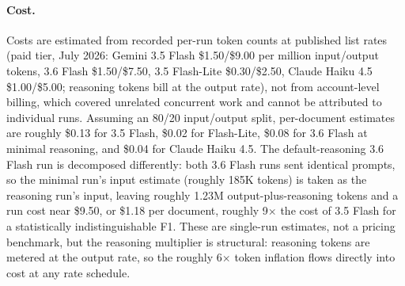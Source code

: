 \documentclass[11pt]{article}
\begin{document}
\paragraph{Cost.} Costs are estimated from recorded per-run token counts
at published list rates (paid tier, July 2026: Gemini 3.5 Flash
\$1.50/\$9.00 per million input/output tokens, 3.6 Flash \$1.50/\$7.50,
3.5 Flash-Lite \$0.30/\$2.50, Claude Haiku 4.5 \$1.00/\$5.00; reasoning
tokens bill at the output rate), not from account-level billing, which
covered unrelated concurrent work and cannot be attributed to individual
runs. Assuming an 80/20 input/output split, per-document estimates are
roughly \$0.13 for 3.5 Flash, \$0.02 for Flash-Lite, \$0.08 for 3.6
Flash at minimal reasoning, and \$0.04 for Claude Haiku 4.5. The
default-reasoning 3.6 Flash run is decomposed differently: both 3.6
Flash runs sent identical prompts, so the minimal run's input estimate
(roughly 185K tokens) is taken as the reasoning run's input, leaving
roughly 1.23M output-plus-reasoning tokens and a run cost near \$9.50,
or \$1.18 per document, roughly 9$\times$ the cost of 3.5 Flash for a
statistically indistinguishable F1. These are single-run estimates, not
a pricing benchmark, but the reasoning multiplier is structural:
reasoning tokens are metered at the output rate, so the roughly
6$\times$ token inflation flows directly into cost at any rate
schedule.
\end{document}

